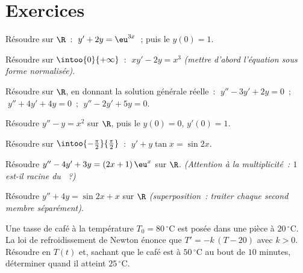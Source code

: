 \section{Exercices}

\begin{exercise}[$\star$]\label{exo:b1:diffeq:1}
Résoudre sur $\R$~: $\;y' + 2y = \eu^{3x}$~; puis le 
$y(0) = 1$.
\end{exercise}

\begin{exercise}[$\star$]\label{exo:b1:diffeq:2}
Résoudre sur $\intoo{0}{+\infty}$~: $\;x y' - 2y = x^3$ \emph{(mettre
d'abord l'équation sous forme normalisée)}.
\end{exercise}

\begin{exercise}[$\star$]\label{exo:b1:diffeq:3}
Résoudre sur $\R$, en donnant la solution générale réelle~:
$\;y'' - 3y' + 2y = 0$~; $\;y'' + 4y' + 4y = 0$~; $\;y'' - 2y' + 5y =
0$.
\end{exercise}

\begin{exercise}[$\star$]\label{exo:b1:diffeq:4}
Résoudre $y'' - y = x^2$ sur $\R$, puis le  $y(0) =
0$, $y'(0) = 1$.
\end{exercise}

\begin{exercise}[$\star\star$]\label{exo:b1:diffeq:5}
Résoudre sur $\intoo{-\frac\pi2}{\frac\pi2}$~:
$\;y' + y\tan x = \sin 2x$.
\end{exercise}

\begin{exercise}[$\star\star$]\label{exo:b1:diffeq:6}
Résoudre $y'' - 4y' + 3y = (2x + 1)\,\eu^{x}$ sur $\R$.
\emph{(Attention à la multiplicité~: $1$ est-il racine du ~?)}
\end{exercise}

\begin{exercise}[$\star\star$]\label{exo:b1:diffeq:7}
Résoudre $y'' + 4y = \sin 2x + x$ sur $\R$ \emph{(superposition~:
traiter chaque second membre séparément)}.
\end{exercise}

\begin{exercise}[$\star\star$]\label{exo:b1:diffeq:8}
Une tasse de café à la température $T_0 = 80\,^\circ$C est posée dans
une pièce à $20\,^\circ$C. La loi de refroidissement de Newton énonce
que $T' = -k\,(T - 20)$ avec $k > 0$. Résoudre en $T(t)$ et, sachant
que le café est à $50\,^\circ$C au bout de $10$ minutes, déterminer
quand il atteint $25\,^\circ$C.
\end{exercise}

